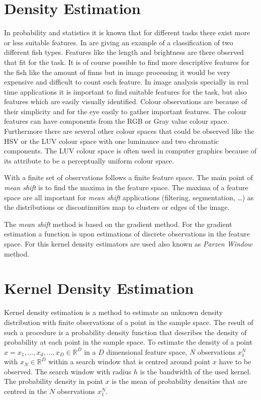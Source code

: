 \section{Density Estimation} %
\label{sec:density_estimation}
In probability and statistics it is known that for different tasks
there exist more or less suitable features. In
\citeauthor{citeulike:167581} \citep{citeulike:167581} are giving an
example of a classification of two different fish types. Features like
the length and brightness are there observed that fit for the task. It
is of course possible to find more descriptive features for the fish
like the amount of finns but in image processing it would be very
expensive and difficult to count such feature. In image analysis
specially in real time applications it is important to find suitable
features for the task, but also features which are easily visually
identified. Colour observations are because of their simplicity and for
the eye easily to gather important features. The colour features can
have components from the \gls{RGB} or Gray value colour
space. Furthermore there are several other colour spaces that could be
observed like the \gls{HSV} or the \gls{LUV} colour space with one
luminance and two chromatic components. The \gls{LUV} colour space is
often used in computer graphics because of its attribute to be a
perceptually uniform colour space.

With a finite set of observations follows a finite feature space. The
main point of \emph{mean shift} is to find the maxima in the feature
space. The maxima of a feature space are all important for \emph{mean
  shift} applications (filtering, segmentation, \ldots) as the
distributions or discontinuities map to clusters or edges of the
image.

The \emph{mean shift} method is based on the gradient method. For the
gradient estimation a function is upon estimations of discrete
observations in the feature space. For this kernel density estimators
are used also known as \emph{Parzen Window} method.

\section{Kernel Density Estimation} %
\label{sec:kernel_density_estimation}
Kernel density estimation is a method to estimate an unknown density
distribution with finite observations of a point in the sample space.
The result of such a procedure is a probability density function that
describes the density of probability at each point in the sample
space. To estimate the density of a point $x = { x_1, \ldots , x_d,
  \ldots , x_D} \in \mathbb{R}^D$ in a $D$ dimensional feature space,
$N$ observations $x_1^N$ with $x_N \in \mathbb{R}^D$ within a search
window that is centred around point $x$ have to be observed. The
search window with radius $h$ is the bandwidth of the used kernel. The
probability density in point $x$ is the mean of probability densities
that are centred in the $N$ observations $x_1^N$.

